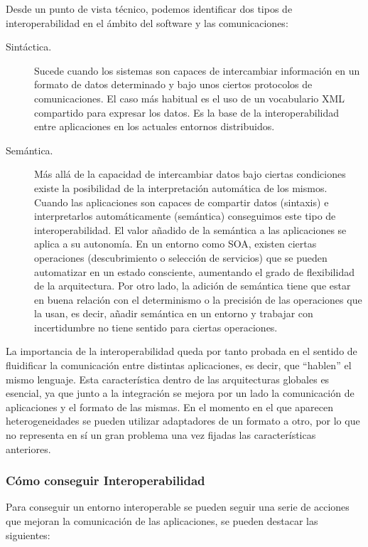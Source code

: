 Desde un punto de vista técnico, podemos identificar dos tipos de interoperabilidad en el ámbito del software y las comunicaciones:
\begin{description}
\item [Sintáctica.] Sucede cuando los sistemas son capaces de intercambiar información 
en un formato de datos determinado y bajo unos ciertos protocolos de
comunicaciones. El caso más habitual es el uso de un vocabulario XML compartido
para expresar los datos. Es la base de la interoperabilidad entre aplicaciones en
los actuales entornos distribuidos.
\item [Semántica.] Más allá de la capacidad de intercambiar datos bajo ciertas
condiciones existe la posibilidad de la interpretación automática de los
mismos. Cuando las aplicaciones son capaces de compartir datos (sintaxis) e
interpretarlos automáticamente (semántica) conseguimos este tipo de
interoperabilidad. El valor añadido de la semántica a las aplicaciones se
aplica a su autonomía. En un entorno como \gls{SOA}, existen ciertas operaciones
(descubrimiento o selección de servicios) que se pueden automatizar en un estado
consciente, aumentando el grado de flexibilidad de la arquitectura. Por otro
lado, la adición de semántica tiene que estar en buena relación con el
determinismo o la precisión de las operaciones que la usan, es decir, añadir
semántica en un entorno y trabajar con incertidumbre no tiene sentido para
ciertas operaciones. 
\end{description}

La importancia de la interoperabilidad queda por tanto probada en el
sentido de fluidificar la comunicación entre distintas aplicaciones, es decir,
que ``hablen'' el mismo lenguaje. Esta característica dentro de las
arquitecturas globales es esencial, ya que junto a la integración se mejora por un
lado la comunicación de aplicaciones y el formato de las mismas. En el
momento en el que aparecen heterogeneidades se pueden utilizar adaptadores de un
formato a otro, por lo que no representa en sí un gran problema una vez fijadas las características anteriores.

\subsubsection{Cómo conseguir Interoperabilidad}
Para conseguir un entorno interoperable se pueden seguir una serie de acciones que mejoran la comunicación de las aplicaciones, 
se pueden destacar las siguientes:


